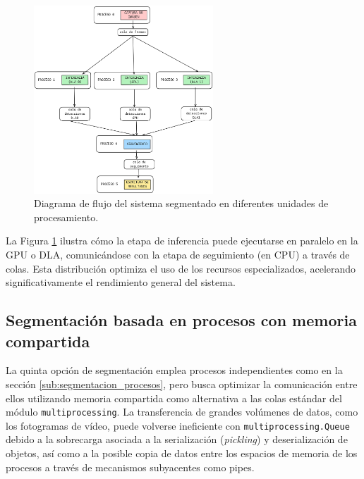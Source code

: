 \documentclass[11pt,spanish,listoffigures,listoftables]{tfgetsinf}
\begin{document}
\begin{figure}[H]
   \centering
   \includegraphics[width=0.6\textwidth]{images/diseno_e_implementacion/segmentacion_multihardware.png}
   \caption[Diagrama de flujo del sistema segmentado en diferentes unidades de procesamiento]{Diagrama de flujo del sistema segmentado en diferentes unidades de procesamiento.}
   \label{fig:segmentacion_multihardware}
\end{figure}

La Figura \ref{fig:segmentacion_multihardware} ilustra cómo la etapa de inferencia puede ejecutarse en paralelo en la GPU o DLA, comunicándose con la etapa de seguimiento (en CPU) a través de colas. Esta distribución optimiza el uso de los recursos especializados, acelerando significativamente el rendimiento general del sistema.


\subsection{Segmentación basada en procesos con memoria compartida} \label{sub:segmentacion_memoria_compartida}


La quinta opción de segmentación emplea procesos independientes como en la sección \ref{sub:segmentacion_procesos}, pero busca optimizar la comunicación entre ellos utilizando memoria compartida como alternativa a las colas estándar del módulo \texttt{multiprocessing}. La transferencia de grandes volúmenes de datos, como los fotogramas de vídeo, puede volverse ineficiente con \texttt{multiprocessing.Queue} debido a la sobrecarga asociada a la serialización (\textit{pickling}) y deserialización de objetos, así como a la posible copia de datos entre los espacios de memoria de los procesos a través de mecanismos subyacentes como pipes.
\end{document}
